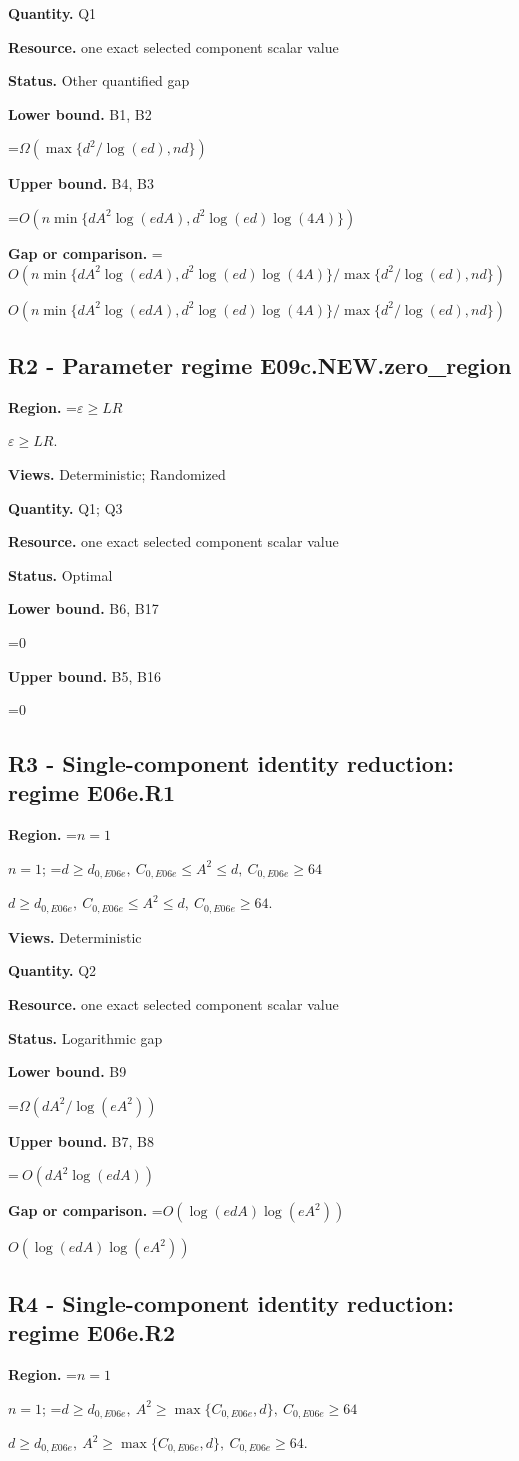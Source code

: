 \documentclass[10pt,a4paper]{article}
\newcommand{\AtlasMath}[1]{\par\begingroup\centering\setbox0=\hbox{$\displaystyle #1$}\ifdim\wd0>1.4\linewidth\typeout{ATLAS WIDE FORMULA: \the\wd0}\fi\ifdim\wd0>\linewidth\resizebox{\linewidth}{!}{\box0}\else\box0\fi\par\endgroup}
\newcommand{\AtlasInlineMath}[1]{\begingroup\setbox0=\hbox{$#1$}\ifdim\wd0>.4\linewidth\endgroup\AtlasMath{#1}\else\endgroup$#1$\fi}
\begin{document}
\textbf{Quantity.} Q1

\textbf{Resource.} one exact selected component scalar value

\textbf{Status.} Other quantified gap

\textbf{Lower bound.} B1, B2

\AtlasMath{\Omega(\max\{d^2/\log(ed),nd\})}
\textbf{Upper bound.} B4, B3

\AtlasMath{O(n\min\{dA^2\log(edA),d^2\log(ed)\log(4A)\})}
\textbf{Gap or comparison.} \AtlasInlineMath{O(n\min\{dA^2\log(edA),d^2\log(ed)\log(4A)\}/\max\{d^2/\log(ed),nd\})}

\subsection{R2 - Parameter regime E09c.NEW.zero\_region}
\textbf{Region.} \AtlasInlineMath{\varepsilon\ge LR}.

\textbf{Views.} Deterministic; Randomized

\textbf{Quantity.} Q1; Q3

\textbf{Resource.} one exact selected component scalar value

\textbf{Status.} Optimal

\textbf{Lower bound.} B6, B17

\AtlasMath{0}
\textbf{Upper bound.} B5, B16

\AtlasMath{0}
\subsection{R3 - Single-component identity reduction: regime E06e.R1}
\textbf{Region.} \AtlasInlineMath{n=1}; \AtlasInlineMath{d\ge d_{0,E06e},\ C_{0,E06e}\le A^2\le d,\ C_{0,E06e}\ge64}.

\textbf{Views.} Deterministic

\textbf{Quantity.} Q2

\textbf{Resource.} one exact selected component scalar value

\textbf{Status.} Logarithmic gap

\textbf{Lower bound.} B9

\AtlasMath{\Omega(dA^2/\log(eA^2))}
\textbf{Upper bound.} B7, B8

\AtlasMath{\ O(dA^2\log(edA))}
\textbf{Gap or comparison.} \AtlasInlineMath{O(\log(edA)\log(eA^2))}

\subsection{R4 - Single-component identity reduction: regime E06e.R2}
\textbf{Region.} \AtlasInlineMath{n=1}; \AtlasInlineMath{d\ge d_{0,E06e},\ A^2\ge\max\{C_{0,E06e},d\},\ C_{0,E06e}\ge64}.
\end{document}
